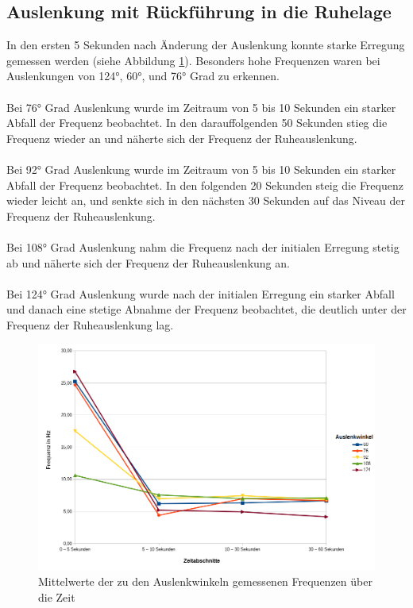 \documentclass[a4paper]{article}
\begin{document}
\subsection{Auslenkung mit Rückführung in die Ruhelage}
In den ersten 5 Sekunden nach Änderung der Auslenkung konnte starke Erregung gemessen werden (siehe Abbildung \ref{fig:A2plot1}). Besonders hohe Frequenzen waren bei Auslenkungen von \ang{124}, \ang{60}, und \ang{76} Grad zu erkennen.\\ \\
Bei \ang{76} Grad Auslenkung wurde im Zeitraum von 5 bis 10 Sekunden ein starker Abfall der Frequenz beobachtet. In den darauffolgenden 50 Sekunden stieg die Frequenz wieder an und näherte sich der Frequenz der Ruheauslenkung.\\ \\
Bei \ang{92} Grad Auslenkung wurde im Zeitraum von 5 bis 10 Sekunden ein starker Abfall der Frequenz beobachtet. In den folgenden 20 Sekunden steig die Frequenz wieder leicht an, und senkte sich in den nächsten 30 Sekunden auf das Niveau der Frequenz der Ruheauslenkung.\\ \\
Bei \ang{108} Grad Auslenkung nahm die Frequenz nach der initialen Erregung stetig ab und näherte sich der Frequenz der Ruheauslenkung an.\\ \\
Bei \ang{124} Grad Auslenkung wurde nach der initialen Erregung ein starker Abfall und danach eine stetige Abnahme der Frequenz beobachtet, die deutlich unter der Frequenz der Ruheauslenkung lag.
\begin{figure}[H]
\centering
    \includegraphics[width=\textwidth]{images/a2plot1.png}
    \caption{Mittelwerte der zu den Auslenkwinkeln gemessenen Frequenzen über die Zeit}
    \label{fig:A2plot1}
\end{figure}
\end{document}
